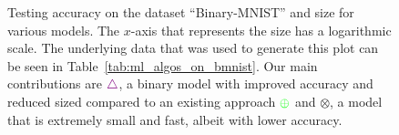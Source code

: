 \begin{figure}[!htb]
    \centering
    
    \caption{Testing accuracy on the dataset \enquote{Binary-MNIST} and size for various models. The $x$-axis that represents the size has a logarithmic scale. The underlying data that was used to generate this plot can be seen in Table~\ref{tab:ml_algos_on_bmnist}. Our main contributions are $\color{violet} \bigtriangleup$, a binary model with improved accuracy and reduced sized compared to an existing approach $\color{green} \oplus$ and $\otimes$, a model that is extremely small and fast, albeit with lower accuracy.}
\label{fig:model_performance}
\end{figure}
\FloatBarrier
